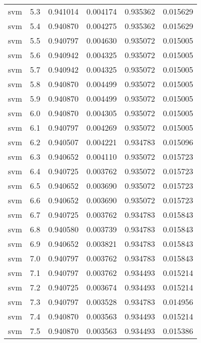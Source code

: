 \begin{tabular}{lrrrrr}
     svm &        5.3 &    0.941014 &   0.004174 &   0.935362 &  0.015629 \\
     svm &        5.4 &    0.940870 &   0.004275 &   0.935362 &  0.015629 \\
     svm &        5.5 &    0.940797 &   0.004630 &   0.935072 &  0.015005 \\
     svm &        5.6 &    0.940942 &   0.004325 &   0.935072 &  0.015005 \\
     svm &        5.7 &    0.940942 &   0.004325 &   0.935072 &  0.015005 \\
     svm &        5.8 &    0.940870 &   0.004499 &   0.935072 &  0.015005 \\
     svm &        5.9 &    0.940870 &   0.004499 &   0.935072 &  0.015005 \\
     svm &        6.0 &    0.940870 &   0.004305 &   0.935072 &  0.015005 \\
     svm &        6.1 &    0.940797 &   0.004269 &   0.935072 &  0.015005 \\
     svm &        6.2 &    0.940507 &   0.004221 &   0.934783 &  0.015096 \\
     svm &        6.3 &    0.940652 &   0.004110 &   0.935072 &  0.015723 \\
     svm &        6.4 &    0.940725 &   0.003762 &   0.935072 &  0.015723 \\
     svm &        6.5 &    0.940652 &   0.003690 &   0.935072 &  0.015723 \\
     svm &        6.6 &    0.940652 &   0.003690 &   0.935072 &  0.015723 \\
     svm &        6.7 &    0.940725 &   0.003762 &   0.934783 &  0.015843 \\
     svm &        6.8 &    0.940580 &   0.003739 &   0.934783 &  0.015843 \\
     svm &        6.9 &    0.940652 &   0.003821 &   0.934783 &  0.015843 \\
     svm &        7.0 &    0.940797 &   0.003762 &   0.934783 &  0.015843 \\
     svm &        7.1 &    0.940797 &   0.003762 &   0.934493 &  0.015214 \\
     svm &        7.2 &    0.940725 &   0.003674 &   0.934493 &  0.015214 \\
     svm &        7.3 &    0.940797 &   0.003528 &   0.934783 &  0.014956 \\
     svm &        7.4 &    0.940870 &   0.003563 &   0.934493 &  0.015214 \\
     svm &        7.5 &    0.940870 &   0.003563 &   0.934493 &  0.015386 \\

\end{tabular}
